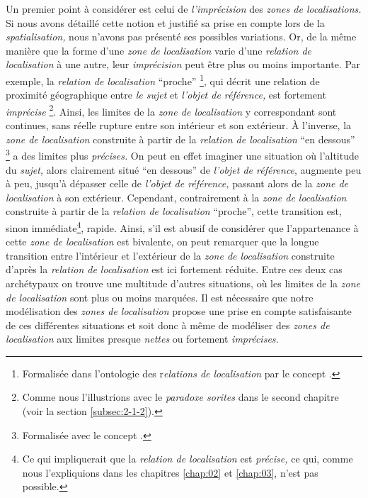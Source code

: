 Un premier point à considérer est celui de \emph{l'imprécision} des
\emph{zones de localisations.} Si nous avons détaillé cette notion et
justifié sa prise en compte lors de la \emph{spatialisation,} nous
n'avons pas présenté ses possibles variations. Or, de la même manière
que la forme d'une \emph{zone de localisation} varie d'une
\emph{relation de localisation} à une autre, leur \emph{imprécision}
peut être plus ou moins importante. Par exemple, la \emph{relation de
  localisation} \enquote{proche} \footnote{Formalisée dans l'ontologie
  des r\emph{elations de localisation} par le concept
  .}, qui décrit une relation de proximité
géographique entre \emph{le sujet} et \emph{l'objet de référence,} est
fortement \emph{imprécise} \footnote{Comme nous l'illustrions avec le
  \emph{paradoxe sorites} dans le second chapitre (voir la section
  \ref{subsec:2-1-2}).}. Ainsi, les limites de la \emph{zone de
  localisation} y correspondant sont continues, sans réelle rupture
entre son intérieur et son extérieur. À l'inverse, la \emph{zone de
  localisation} construite à partir de la \emph{relation de
  localisation} \enquote{en dessous} \footnote{Formalisée avec le
  concept .} a des limites plus
\emph{précises.} On peut en effet imaginer une situation où l'altitude
du \emph{sujet,} alors clairement situé \enquote{en dessous} de
\emph{l'objet de référence}, augmente peu à peu, jusqu'à dépasser
celle de \emph{l'objet de référence,} passant alors de la \emph{zone
  de localisation} à son extérieur. Cependant, contrairement à la
\emph{zone de localisation} construite à partir de la \emph{relation
  de localisation} \enquote{proche}, cette transition est, sinon
immédiate\footnote{Ce qui impliquerait que la \emph{relation de
    localisation} est \emph{précise,} ce qui, comme nous l'expliquions
  dans les chapitres \ref{chap:02} et \ref{chap:03}, n'est pas
  possible.}, rapide. Ainsi, s'il est abusif de considérer que
l'appartenance à cette \emph{zone de localisation} est bivalente, on
peut remarquer que la longue transition entre l'intérieur et
l'extérieur de la \emph{zone de localisation} construite d'après la
\emph{relation de localisation}  est ici fortement
réduite. Entre ces deux cas archétypaux on trouve une multitude
d'autres situations, où les limites de la \emph{zone de localisation}
sont plus ou moins marquées. Il est nécessaire que notre modélisation
des \emph{zones de localisation} propose une prise en compte
satisfaisante de ces différentes situations et soit donc à même de
modéliser des \emph{zones de localisation} aux limites presque
\emph{nettes} ou fortement \emph{imprécises.}

